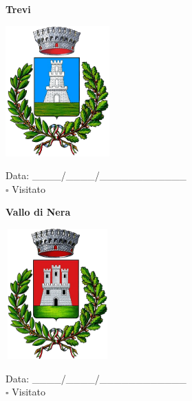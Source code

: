 \documentclass[a5paper,12pt]{article}
\begin{document}
\newpage

\noindent
\begin{minipage}[t]{0.45\textwidth}
    \begin{center}
        \textbf{Trevi}
    \end{center}
    \vspace{-0.5cm} %
    \begin{center}
        \includegraphics[height= 5cm, width=4cm]{Umbria/Stemma Trevi.png}
    \end{center}
    \vspace{-0.4cm} %
    \begin{flushleft}
        Data: \_\_\_\_/\_\_\_\_/\_\_\_\_\_\_\_\_\_\_\_\_ \\
        $\square$ Visitato
    \end{flushleft}
\end{minipage}
\hfill
\noindent
\begin{minipage}[t]{0.45\textwidth}
    \begin{center}
        \textbf{Vallo di Nera}
    \end{center}
    \vspace{-0.5cm} %
    \begin{center}
        \includegraphics[height= 5cm, width=4cm]{Umbria/Stemma Vallo di Nera.png}
    \end{center}
    \vspace{-0.4cm} %
    \begin{flushleft}
        Data: \_\_\_\_/\_\_\_\_/\_\_\_\_\_\_\_\_\_\_\_\_ \\
        $\square$ Visitato
    \end{flushleft}
\end{minipage}
\end{document}
